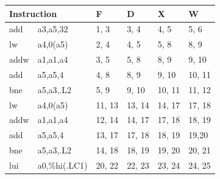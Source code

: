 \documentclass[a4paper,11pt,fleqn]{article}
\theoremstyle{mytheor}
\begin{document}
\begin{tabular}{|| l  l | l | l | l | l ||}
\hline
\multicolumn{2}{||l|}{Instruction} & F & D & X & W\\
\hline
add & a3,a5,32 &1, 3&3, 4&4, 5&5, 6\\
\hline
lw  & a4,0(a5) & 2, 4& 4, 5&5, 8&8, 9\\
\hline
addw & a1,a1,a4& 3, 5&5, 8&8, 9& 9, 10\\
\hline
add&a5,a5,4&4, 8&8, 9&9, 10&10, 11\\
\hline
bne&a5,a3,.L2&5, 9&9, 10&10, 11&11, 12\\
\hline
lw  & a4,0(a5)&11, 13&13, 14&14, 17&17, 18\\
\hline
addw & a1,a1,a4&12, 14&14, 17&17, 18&18, 19\\
\hline
add&a5,a5,4&13, 17&17, 18&18, 19&19,20\\
\hline
bne&a5,a3,.L2&14, 18&18, 19&19, 20&20, 21\\
\hline
lui&a0,\%hi(.LC1)&20, 22&22, 23&23, 24&24, 25\\
\hline
\end{tabular}
\end{document}
